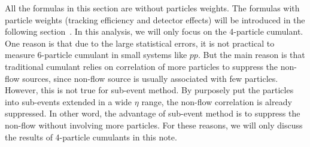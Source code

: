All the formulas in this section are without particles weights. The formulas with particle weights (tracking efficiency and detector effects) will be introduced in the following section~\cite{Abelev:2014mda}. In this analysis, we will only focus on the 4-particle cumulant. One reason is that due to the large statistical errors, it is not practical to measure 6-particle cumulant in small systems like $pp$. But the main reason is that traditional cumulant relies on correlation of more particles to suppress the non-flow sources, since non-flow source is usually associated with few particles. However, this is not true for sub-event method. By purposely put the particles into sub-events extended in a wide $\eta$ range, the non-flow correlation is already suppressed. In other word, the advantage of sub-event method is to suppress the non-flow without involving more particles. For these reasons, we will only discuss the results of 4-particle cumulants in this note. 



